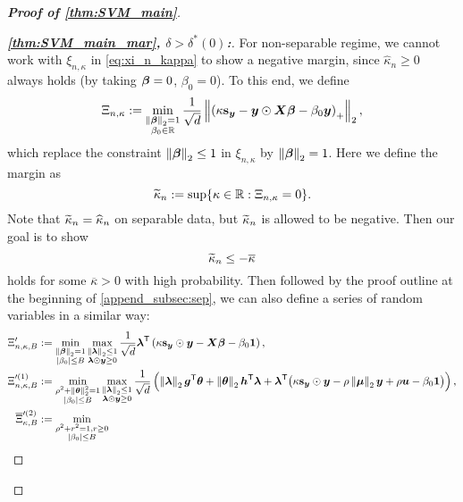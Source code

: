 \begin{proof}[\textbf{Proof of \cref{thm:SVM_main}}]
\begin{proof}[\textbf{\emph{\ref{thm:SVM_main_mar}, $\delta > \delta^*(0)$:}}]
For non-separable regime, we cannot work with $\xi_{n, \kappa}$ in \cref{eq:xi_n_kappa} to show a negative margin, since $\hat\kappa_n \ge 0$ always holds (by taking ${\boldsymbol{\beta}} = 0$, $\beta_0 = 0$). To this end, we define
\begin{equation*}
    \Xi_{n, \kappa} := \min_{ \substack{ \left\|{{\boldsymbol{\beta}}}\right\|_2 = 1 \\ \beta_0 \in \mathbb{R}} } \frac{1}{\sqrt{d}} \left\|{ \left( \kappa \mathrm{\bf s}_{\text{\boldmath $y$}} - \text{\boldmath $y$} \odot \text{\boldmath $X$} {\boldsymbol{\beta}}  - \beta_0 \text{\boldmath $y$} \right)_+ }\right\|_2,
\end{equation*}
which replace the constraint $\left\|{{\boldsymbol{\beta}}}\right\|_2 \le 1$ in $\xi_{n, \kappa}$ by $\left\|{{\boldsymbol{\beta}}}\right\|_2 = 1$. Here we define the margin as
\begin{equation}\label{eq:wt_kappa_def}
    \widetilde\kappa_n := \sup\{ \kappa \in \mathbb{R}:  \Xi_{n,\kappa} = 0 \}.
\end{equation}
Note that $\widetilde\kappa_n = \widehat\kappa_n$ on separable data, but $\widetilde\kappa_n$ is allowed to be negative. Then our goal is to show
\begin{equation}\label{eq:neg_kappa}
    \widetilde\kappa_n \le -\overline{\kappa}
\end{equation}
holds for some $\overline{\kappa} > 0$ with high probability. Then followed by the proof outline at the beginning of \cref{append_subsec:sep}, we can also define a series of random variables in a similar way:
\begin{align*}
    \Xi'_{n, \kappa, B} & := \min_{ \substack{ \norm{\vbeta}_2 = 1 \\ \abs{\beta_0} \le B } } \max_{ \substack{ \norm{\blambda}_2 \le 1 \\ \blambda \odot \yy \ge 0} } \frac{1}{\sqrt{d}} \blambda^\top \left( \kappa \bs_\yy \odot \yy - \XX \vbeta  - \beta_0 \bone \right),
    \\
    \Xi_{n, \kappa, B}'^{(1)} & := \min_{ \substack{ \rho^2 + \norm{\vtheta}_2^2 = 1 \\ \abs{\beta_0} \le B } } \max_{ \substack{ \norm{\blambda}_2 \le 1 \\ \blambda \odot \yy \ge 0} } \frac{1}{\sqrt{d}}  \left(
    \norm{\blambda}_2 \vg^\top \btheta + \norm{\btheta}_2 \vh^\top \blambda + \blambda^\top \bigl( 
        \kappa \bs_\yy \odot \yy - \rho\norm{\bmu}_2 \yy + \rho \vu - \beta_0 \bone
     \bigr)
     \right),
    \\
    \bar\Xi'^{(2)}_{\kappa, B} & :=  \min_{ \substack{ \rho^2 + r^2 = 1, r \ge 0 \\  \abs{\beta_0} \le B } }

\end{align*}
\end{proof}
\end{proof}
